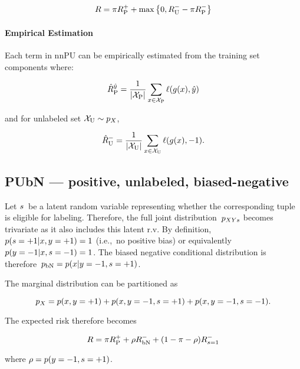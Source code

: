\begin{equation}\label{eq:Risk:nnPU}
  R = \pi R_{\textnormal{P}}^{{+}} + \max\left\{0, R_{\textnormal{U}}^{{-}} - \pi R_{\textnormal{P}}^{{-}} \right\}
\end{equation}

\paragraph{Empirical Estimation} Each term in nnPU can be empirically estimated from the training set components where:

\begin{equation}\label{eq:EmpRisk:Pos}
  \hat{R}_{\textnormal{P}}^{\hat{y}} = \frac{1}{\lvert\mathcal{X}_{\textnormal{P}}\rvert} \sum_{x \in \mathcal{X}_{\textnormal{P}}} \ell\mathopen{}\left(g\mathopen{}\left(x\right)\mathclose{},\hat{y}\right)\mathclose{}
\end{equation}

and for unlabeled set ${\mathcal{X}_{\textnormal{U}} \sim p_{X}}$,

\begin{equation}\label{eq:}
  \hat{R}_{\textnormal{U}}^{-} = \frac{1}{\lvert\mathcal{X}_{\textnormal{U}}\rvert} \sum_{x \in \mathcal{X}_{\textnormal{U}}} \ell\mathopen{}\left(g\mathopen{}\left(x\right)\mathclose{},{-}1\right)\mathclose{} \text{.}
\end{equation}

\subsection{PUbN --- positive, unlabeled, biased-negative}

Let $s$~be a latent random variable representing whether the corresponding tuple is eligible for labeling.  Therefore, the full joint distribution~$p_{XYs}$ becomes trivariate as it also includes this latent r.v.  By definition, ${p(s = {+}1 \vert x, y = {+}1) = 1}$ (i.e.,~no positive bias) or equivalently ${p(y = {-}1 \vert x, s = {-}1) = 1}$.  The biased negative conditional distribution is therefore~${p_{\textnormal{bN}} = p(x \vert y = {-}1, s = {+}1)}$.

The marginal distribution can be partitioned as

\begin{equation*}
  p_{X} = p(x, y = {+}1) + p(x, y = {-}1, s = {+}1) + p(x, y = {-}1, s = {-}1) \text{.}
\end{equation*}

\noindent
The expected risk therefore becomes

\begin{equation}\label{eq:Risk:WithBN}
  R = \pi R_{\textnormal{P}}^{{+}} + \rho R_{\textnormal{bN}}^{{-}} + (1 - \pi - \rho) R_{s=1}^{-}
\end{equation}

\noindent
where ${\rho = p(y = {-}1, s = {+}1)}$.
